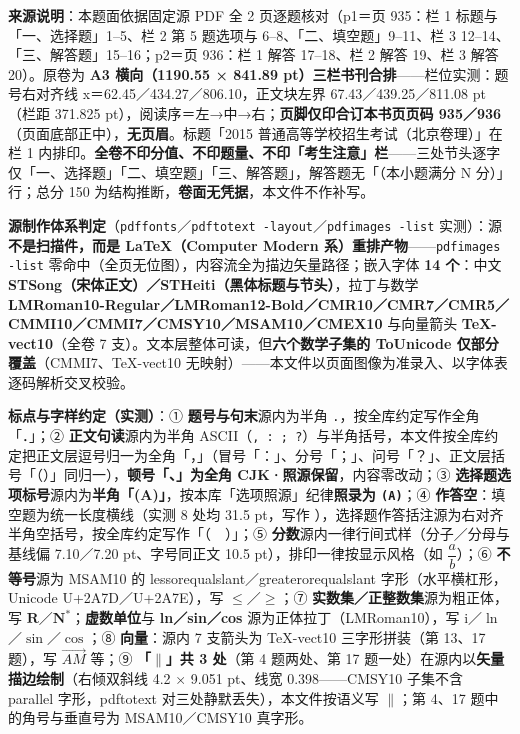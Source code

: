 


\begin{gktip}
\textbf{来源说明}：本题面依据固定源 PDF 全 2 页逐题核对（p1＝页 935：栏 1 标题与「一、选择题」1–5、栏 2 第 5 题选项与 6–8、「二、填空题」9–11、栏 3 12–14、「三、解答题」15–16；p2＝页 936：栏 1 解答 17–18、栏 2 解答 19、栏 3 解答 20）。原卷为 \textbf{A3 横向（1190.55 × 841.89 pt）三栏书刊合排}——栏位实测：题号右对齐线 x＝62.45／434.27／806.10，正文块左界 67.43／439.25／811.08 pt（栏距 371.825 pt），阅读序＝左→中→右；\textbf{页脚仅印合订本书页页码 935／936}（页面底部正中），\textbf{无页眉}。标题「2015 普通高等学校招生考试（北京卷理）」在栏 1 内排印。\textbf{全卷不印分值、不印题量、不印「考生注意」栏}——三处节头逐字仅「一、选择题」「二、填空题」「三、解答题」，解答题无「（本小题满分 N 分）」行；总分 150 为结构推断，\textbf{卷面无凭据}，本文件不作补写。

\textbf{源制作体系判定}（\texttt{pdffonts}／\texttt{pdftotext -layout}／\texttt{pdfimages -list} 实测）：源\textbf{不是扫描件，而是 LaTeX（Computer Modern 系）重排产物}——\texttt{pdfimages -list} 零命中（全页无位图），内容流全为描边矢量路径；嵌入字体 \textbf{14 个}：中文 \textbf{STSong（宋体正文）／STHeiti（黑体标题与节头）}，拉丁与数学 \textbf{LMRoman10-Regular／LMRoman12-Bold／CMR10／CMR7／CMR5／CMMI10／CMMI7／CMSY10／MSAM10／CMEX10} 与向量箭头 \textbf{TeX-vect10}（全卷 7 支）。文本层整体可读，但\textbf{六个数学子集的 ToUnicode 仅部分覆盖}（CMMI7、TeX-vect10 无映射）——本文件以页面图像为准录入、以字体表逐码解析交叉校验。

\textbf{标点与字样约定（实测）}：① \textbf{题号与句末}源内为半角 \texttt{.}，按全库约定写作全角「．」；② \textbf{正文句读}源内为半角 ASCII（\texttt{, : ; ?}）与半角括号，本文件按全库约定把正文层逗号归一为全角「，」（冒号「：」、分号「；」、问号「？」、正文层括号「（）」同归一），\textbf{顿号「、」为全角 CJK·照源保留}，内容零改动；③ \textbf{选择题选项标号}源内为\textbf{半角「(A)」}，按本库「选项照源」纪律\textbf{照录为 \texttt{(A)}}；④ \textbf{作答空}：填空题为统一长度横线（实测 8 处均 31.5 pt，写作 \texttt{\gkblank{}}），选择题作答括注源为右对齐半角空括号，按全库约定写作「（　）」；⑤ \textbf{分数}源内一律行间式样（分子／分母与基线偏 7.10／7.20 pt、字号同正文 10.5 pt），排印一律按显示风格（如 \(\dfrac{a}{b}\)）；⑥ \textbf{不等号}源为 MSAM10 的 lessorequalslant／greaterorequalslant 字形（水平横杠形，Unicode U+2A7D／U+2A7E），写 \(\leqslant\)／\(\geqslant\)；⑦ \textbf{实数集／正整数集}源为粗正体，写 \(\mathbf{R}\)／\(\mathbf{N}^{*}\)；\textbf{虚数单位}与 \textbf{ln／sin／cos} 源为正体拉丁（LMRoman10），写 \(\mathrm{i}\)／\(\ln\)／\(\sin\)／\(\cos\)；⑧ \textbf{向量}：源内 7 支箭头为 TeX-vect10 三字形拼装（第 13、17 题），写 \(\overrightarrow{AM}\) 等；⑨ \textbf{「$\parallel$」共 3 处}（第 4 题两处、第 17 题一处）在源内以\textbf{矢量描边绘制}（右倾双斜线 4.2 × 9.051 pt、线宽 0.398——CMSY10 子集不含 parallel 字形，pdftotext 对三处静默丢失），本文件按语义写 \(\parallel\)；第 4、17 题中的角号与垂直号为 MSAM10／CMSY10 真字形。


\end{gktip}
